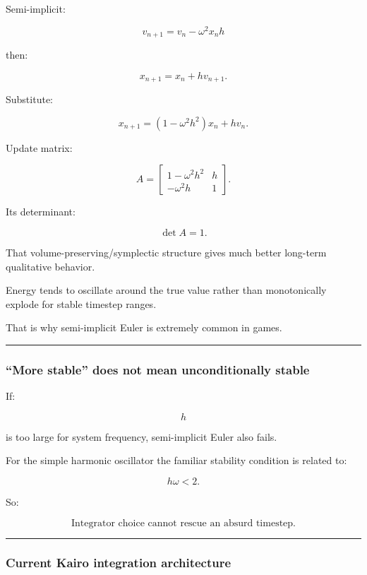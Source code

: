 Semi-implicit:

\[
v_{n+1}
=
v_n-\omega^2x_nh
\]

then:

\[
x_{n+1}
=
x_n+h v_{n+1}.
\]

Substitute:

\[
x_{n+1}
=
(1-\omega^2h^2)x_n+
hv_n.
\]

Update matrix:

\[
A=
\begin{bmatrix}
1-\omega^2h^2&h\\
-\omega^2h&1
\end{bmatrix}.
\]

Its determinant:

\[
\det A=1.
\]

That volume-preserving/symplectic structure gives much better long-term qualitative behavior.

Energy tends to oscillate around the true value rather than monotonically explode for stable timestep ranges.

That is why semi-implicit Euler is extremely common in games.

\begin{center}\rule{0.5\linewidth}{0.5pt}\end{center}

\subsubsection{``More stable'' does not mean unconditionally stable}\label{more-stable-does-not-mean-unconditionally-stable}

If:

\[
h
\]

is too large for system frequency, semi-implicit Euler also fails.

For the simple harmonic oscillator the familiar stability condition is related to:

\[
h\omega<2.
\]

So:

\[
\boxed{
\text{Integrator choice cannot rescue an absurd timestep.}
}
\]

\begin{center}\rule{0.5\linewidth}{0.5pt}\end{center}

\subsubsection{Current Kairo integration architecture}\label{current-kairo-integration-architecture}

